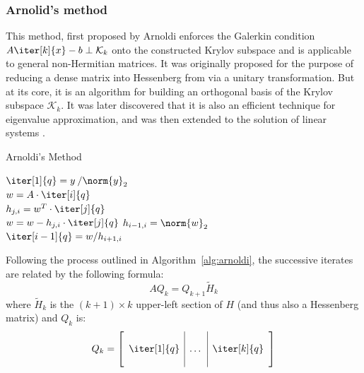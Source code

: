 \subsubsection{Arnolid's method}
\label{sec:arnoldi}
This method, first proposed by Arnoldi \cite{arnoldi_principle_1951} enforces the Galerkin condition $A\iter[k]{x} -b \perp \mathcal{K}_k$ onto the constructed Krylov subspace and is applicable to general non-Hermitian matrices. It was originally proposed for the purpose of reducing a dense matrix into Hessenberg from via a unitary transformation. But at its core, it is an algorithm for building an orthogonal basis of the Krylov subspace $\mathcal{K}_k$. It was later discovered that it is also an efficient technique for eigenvalue approximation, and was then extended to the solution of linear systems \cite{saad_iterative_2003}. 

\begin{algorithm}[h]
  \caption{Arnoldi's Method}
  \label{alg:arnoldi}
  \SetAlgoLined
  $\iter[1]{q}= y\:/\norm{y}_2$ \\
   {
    $w =A\cdot \iter[i]{q}$ \\
     {
      $h_{j,i} = w^T\cdot \iter[j]{q}$ \\
      $ w = w - h_{j,i}\cdot \iter[j]{q}$}
    $h_{i-1,i} = \norm{w}_2$ \\
    $\iter[i-1]{q} = w/h_{i+1,i}$
  }
\end{algorithm}

\noindent Following the process outlined in Algorithm~\hyperref[alg:arnoldi]{\ref{alg:arnoldi}}, the successive iterates are related by the following formula:
\begin{equation}
\label{eqn:arnoldi}
AQ_k=Q_{k+1}\tilde{H}_k
\end{equation}
\noindent where $\tilde{H}_k$ is the $(k+1) \times k$ upper-left section of $H$ (and thus also a Hessenberg matrix) and $Q_k$ is:
\begin{equation}
  Q_k =
  \left[
    \begin{array}{c|c|c}
      & & \\
      \iter[1]{q} &\dots & \iter[k]{q} \\
      & & \\
    \end{array}
  \right] 
\end{equation}


